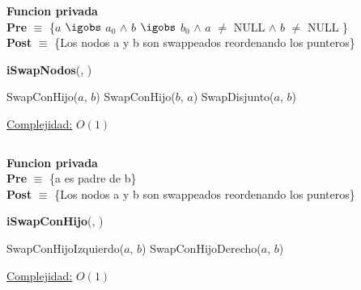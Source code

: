 \begin{Algoritmos}


\textbf{Funcion privada}\\
\textbf{Pre} $\equiv$ \{$a$ $\igobs$ $a_0$ $\land$ $b$ $\igobs$ $b_0$ $\land$ $a$ $\neq$ NULL $\land$ $b$ $\neq$ NULL \}\\%
\textbf{Post} $\equiv$ \{Los nodos a y b son swappeados reordenando los punteros\}%
\begin{algorithm}[H]
{\textbf{iSwapNodos}(, )}
\begin{algorithmic}[1]

        \State SwapConHijo($a$, $b$)
    \Else
            \State SwapConHijo($b$, $a$)
        \Else
            \State SwapDisjunto($a$, $b$)
        \EndIf 
    \EndIf 

    \medskip
    \Statex \underline{Complejidad:} $O(1)$

\end{algorithmic}
\end{algorithm}




$ $\newline

\textbf{Funcion privada}\\
\textbf{Pre} $\equiv$ \{a es padre de b\}\\%
\textbf{Post} $\equiv$ \{Los nodos a y b son swappeados reordenando los punteros\}%
\begin{algorithm}[H]
{\textbf{iSwapConHijo}(, )}
\begin{algorithmic}[1]

        \State SwapConHijoIzquierdo($a$, $b$)
    \Else {}
            \State SwapConHijoDerecho($a$, $b$)
        \EndIf 
    \EndIf 

    \medskip
    \Statex \underline{Complejidad:} $O(1)$

\end{algorithmic}
\end{algorithm}

$ $\newline



$ $\newline


\end{Algoritmos}
